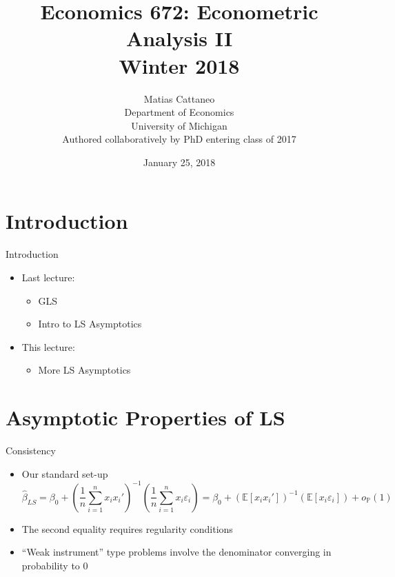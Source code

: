 \documentclass[fleqn, 10pt]{beamer}
\title[Econ-672]{Economics 672: Econometric Analysis II \\ Winter 2018}
\author[M. Cattaneo]{Matias Cattaneo \\
        Department of Economics \\
        University of Michigan \\
        Authored collaboratively by PhD entering class of 2017
        }
\date{January 25, 2018}
\newcommand{\p}{\mathbb{P}}
\newcommand{\E}{\mathbb{E}}
\begin{document}


\begin{frame}[plain]
    \titlepage
\end{frame}


\section{Introduction}

\begin{frame}{Introduction}
    \begin{itemize}
		\item Last lecture:
	    \begin{itemize}
			\item GLS
			\item Intro to LS Asymptotics
		\end{itemize}
		\item This lecture:
	    \begin{itemize}
			\item More LS Asymptotics
		\end{itemize}
	\end{itemize}
\end{frame}


\section{Asymptotic Properties of LS}

\begin{frame}{Consistency}

    \begin{itemize}
		\item Our standard set-up
		\[ \hat{\beta}_{LS} = \beta_0 + \left( \frac{1}{n} \sum_{i=1}^{n} x_i x_i' \right)^{-1} \left( \frac{1}{n} \sum_{i=1}^{n} x_i \varepsilon_i \right) = \beta_0 + \left( \E[ x_i x_i'] \right)^{-1} \left( \E[ x_i \varepsilon_i ] \right) + o_{\p}(1) \]
		\item The second equality requires regularity conditions
		\item ``Weak instrument'' type problems involve the denominator converging in probability to 0
	\end{itemize}
	
\end{frame}
\end{document}
